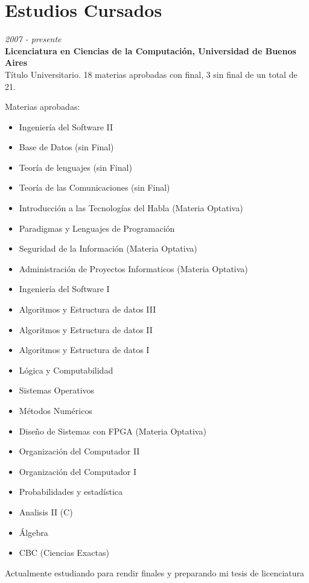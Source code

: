 \section{Estudios Cursados}

\begin{large}\textit{2007 - presente}\\
	   \textbf{Licenciatura en Ciencias de la Computación, Universidad de Buenos Aires}\\
	  Título Universitario. 18 materias aprobadas con final, 3 sin final de un total de 21.\\
\end{large}
Materias aprobadas:
\begin{multicols}{2}
\begin{itemize}
    \item Ingeniería del Software II
    \item Base de Datos (sin Final)
    \item Teoría de lenguajes (sin Final)
    \item Teoría de las Comunicaciones (sin Final)
    \item Introducción a las Tecnologías del Habla (Materia Optativa)
    \item Paradigmas y Lenguajes de Programación
    \item Seguridad de la Información (Materia Optativa)
    \item Administración de Proyectos Informaticos (Materia Optativa)
    \item Ingeniería del Software I
    \item Algoritmos y Estructura de datos III
    \item Algoritmos y Estructura de datos II
    \item Algoritmos y Estructura de datos I
    \item Lógica y Computabilidad
    \item Sistemas Operativos
    \item Métodos Numéricos
    \item Diseño de Sistemas con FPGA (Materia Optativa)
    \item Organización del Computador II
    \item Organización del Computador I
    \item Probabilidades y estadística
    \item Analisis II (C)
    \item Álgebra
    \item CBC (Ciencias Exactas)
\end{itemize}
\end{multicols}

\noindent Actualmente estudiando para rendir finales y preparando mi tesis de licenciatura


